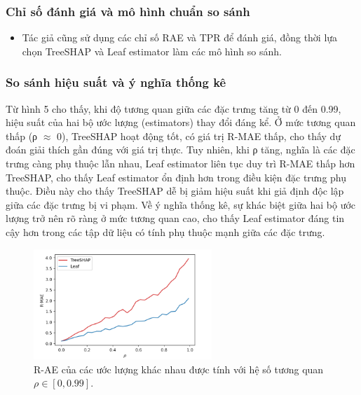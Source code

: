 \documentclass[12pt, a4paper]{article}
\begin{document}
\subsubsection{Chỉ số đánh giá và mô hình chuẩn so sánh}
        \begin{itemize}[align=parleft, left=4em, labelsep=1em, itemsep=0.5em]
            \item Tác giả cũng sử dụng các chỉ số RAE và TPR để đánh giá, đồng thời lựa chọn TreeSHAP và Leaf estimator làm các mô hình so sánh.
        \end{itemize}

\subsubsection{So sánh hiệu suất và ý nghĩa thống kê}
\begin{adjustwidth}{2.0em}{0cm}
Từ hình 5 cho thấy, khi độ tương quan giữa các đặc trưng tăng từ 0 đến 0.99, hiệu suất của hai bộ ước lượng (estimators) thay đổi đáng kể. Ở mức tương quan thấp (ρ $\approx$ 0), TreeSHAP hoạt động tốt, có giá trị R-MAE thấp, cho thấy dự đoán giải thích gần đúng với giá trị thực. Tuy nhiên, khi ρ tăng, nghĩa là các đặc trưng càng phụ thuộc lẫn nhau, Leaf estimator liên tục duy trì R-MAE thấp hơn TreeSHAP, cho thấy Leaf estimator ổn định hơn trong điều kiện đặc trưng phụ thuộc. Điều này cho thấy TreeSHAP dễ bị giảm hiệu suất khi giả định độc lập giữa các đặc trưng bị vi phạm. Về ý nghĩa thống kê, sự khác biệt giữa hai bộ ước lượng trở nên rõ ràng ở mức tương quan cao, cho thấy Leaf estimator đáng tin cậy hơn trong các tập dữ liệu có tính phụ thuộc mạnh giữa các đặc trưng.

\begin{figure}[H]
    \centering
    \includegraphics[width=0.6\textwidth]{img/restult_experiment_2.png}
    \caption{R-AE của các ước lượng khác nhau được tính với hệ số tương quan 
    $\rho \in [0, 0.99]$.}
\end{figure}
\end{adjustwidth}
\end{document}
